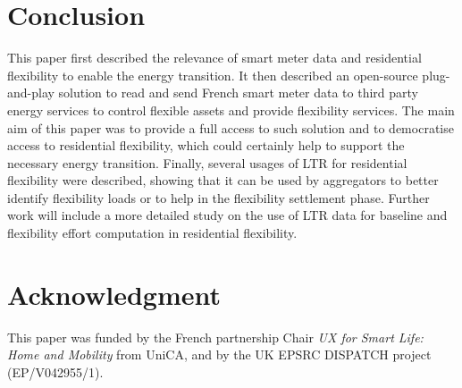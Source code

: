 \documentclass[conference]{IEEEtran}
\begin{document}
%
%
%





\section{Conclusion}
This paper first described the relevance of smart meter data and residential flexibility to enable the energy transition. It then described an open-source plug-and-play solution to read and send French smart meter data to third party energy services to control flexible assets and provide flexibility services. The main aim of this paper was to provide a full access to such solution and to democratise access to residential flexibility, which could certainly help to support the necessary energy transition. Finally, several usages of LTR for residential flexibility were described, showing that it can  be used by aggregators to better identify flexibility loads or to help in the flexibility settlement phase. Further work will include a more  detailed study on the use of LTR data for baseline and flexibility effort computation in residential flexibility. 

\section*{Acknowledgment}
This paper was funded by the French partnership Chair \textit{UX for Smart Life: Home and Mobility} from UniCA, and by the UK EPSRC DISPATCH project (EP/V042955/1).





\ %
\end{document}
